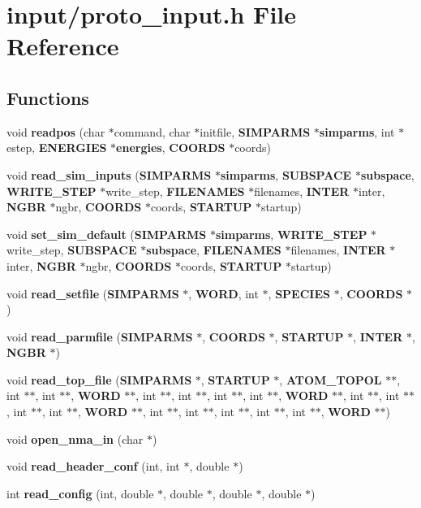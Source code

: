 \section{input/proto\_\-input.h File Reference}
\label{input_2proto__input_8h}
\subsection*{Functions}
\begin{CompactItemize}
\item 
void {\bf readpos} (char $\ast$command, char $\ast$initfile, {\bf SIMPARMS} $\ast${\bf simparms}, int $\ast$estep, {\bf ENERGIES} $\ast${\bf energies}, {\bf COORDS} $\ast$coords)
\item 
void {\bf read\_\-sim\_\-inputs} ({\bf SIMPARMS} $\ast${\bf simparms}, {\bf SUBSPACE} $\ast${\bf subspace}, {\bf WRITE\_\-STEP} $\ast$write\_\-step, {\bf FILENAMES} $\ast$filenames, {\bf INTER} $\ast$inter, {\bf NGBR} $\ast$ngbr, {\bf COORDS} $\ast$coords, {\bf STARTUP} $\ast$startup)
\item 
void {\bf set\_\-sim\_\-default} ({\bf SIMPARMS} $\ast${\bf simparms}, {\bf WRITE\_\-STEP} $\ast$write\_\-step, {\bf SUBSPACE} $\ast${\bf subspace}, {\bf FILENAMES} $\ast$filenames, {\bf INTER} $\ast$inter, {\bf NGBR} $\ast$ngbr, {\bf COORDS} $\ast$coords, {\bf STARTUP} $\ast$startup)
\item 
void {\bf read\_\-setfile} ({\bf SIMPARMS} $\ast$, {\bf WORD}, int $\ast$, {\bf SPECIES} $\ast$, {\bf COORDS} $\ast$)
\item 
void {\bf read\_\-parmfile} ({\bf SIMPARMS} $\ast$, {\bf COORDS} $\ast$, {\bf STARTUP} $\ast$, {\bf INTER} $\ast$, {\bf NGBR} $\ast$)
\item 
void {\bf read\_\-top\_\-file} ({\bf SIMPARMS} $\ast$, {\bf STARTUP} $\ast$, {\bf ATOM\_\-TOPOL} $\ast$$\ast$, int $\ast$$\ast$, int $\ast$$\ast$, {\bf WORD} $\ast$$\ast$, int $\ast$$\ast$, int $\ast$$\ast$, int $\ast$$\ast$, int $\ast$$\ast$, {\bf WORD} $\ast$$\ast$, int $\ast$$\ast$, int $\ast$$\ast$, int $\ast$$\ast$, int $\ast$$\ast$, {\bf WORD} $\ast$$\ast$, int $\ast$$\ast$, int $\ast$$\ast$, int $\ast$$\ast$, int $\ast$$\ast$, int $\ast$$\ast$, {\bf WORD} $\ast$$\ast$)
\item 
void {\bf open\_\-nma\_\-in} (char $\ast$)
\item 
void {\bf read\_\-header\_\-conf} (int, int $\ast$, double $\ast$)
\item 
int {\bf read\_\-config} (int, double $\ast$, double $\ast$, double $\ast$, double $\ast$)

\end{CompactItemize}
